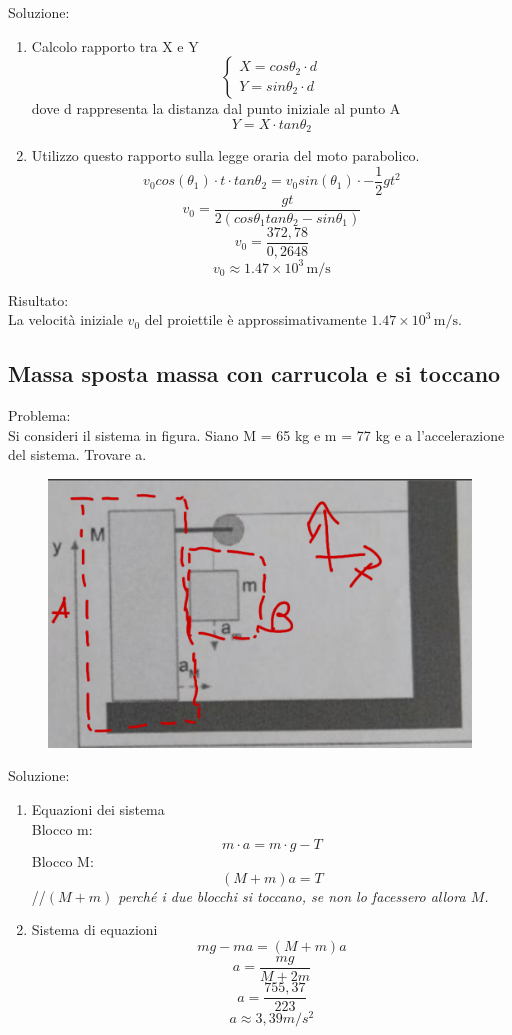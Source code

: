 \documentclass{article}
\begin{document}
Soluzione:
\begin{enumerate}
    \item Calcolo rapporto tra X e Y 
    \[
        \begin{cases}
            X = cos \theta_2 \cdot d \\
            Y = sin \theta_2 \cdot d
        \end{cases}
    \]
    dove d rappresenta la distanza dal punto iniziale al punto A
    \[Y = X \cdot tan \theta_2\]
    \item Utilizzo questo rapporto sulla legge oraria del moto parabolico.
    \[v_0 cos(\theta_1) \cdot t \cdot tan \theta_2 = v_0 sin(\theta_1) \cdot - \frac{1}{2}gt^2\]
    \[v_0 = \frac{gt}{2(cos \theta_1 tan \theta_2 - sin \theta_1)}\]
    \[v_0 = \frac{372,78}{0,2648}\]
    \[v_0 \approx 1.47 \times 10^3 \, \text{m/s}\]
\end{enumerate}

\noindent Risultato:\\
La velocità iniziale \( v_0 \) del proiettile è approssimativamente \( 1.47 \times 10^3 \, \text{m/s} \).
\subsection{Massa sposta massa con carrucola e si toccano}
Problema:\\
Si consideri il sistema in figura. Siano M = 65 kg e m = 77 kg e a l'accelerazione del sistema. Trovare a.
\begin{figure}[ht]
    \centering
    \includegraphics[width=0.5\linewidth]{Immagini/massaspostamassacarrucola.png}
\end{figure}

\noindent Soluzione:
\begin{enumerate}
    \item Equazioni dei sistema\\
    Blocco m:
    \[ m \cdot a = m \cdot g - T\]
    Blocco M:
    \[ (M + m)  a = T\]
    //\textit{\((M + m)\) perché i due blocchi si toccano, se non lo facessero allora \(M\).}
    \item Sistema di equazioni
    \[mg - ma = (M + m)a\]
    \[ a = \frac{mg}{M + 2m}\]
    \[ a = \frac{755,37}{223}\]
    \[a \approx 3,39 m/s^2\]
\end{enumerate}
\end{document}
